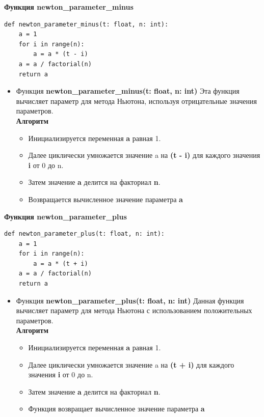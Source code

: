 \documentclass{article}
\begin{document}
\textbf{\large{Функция newton\_parameter\_minus}}

\begin{lstlisting}
def newton_parameter_minus(t: float, n: int):
    a = 1
    for i in range(n):
        a = a * (t - i)
    a = a / factorial(n)
    return a

\end{lstlisting}

\begin{itemize}
\item Функция \textbf{newton\_parameter\_minus(t: float, n: int)} 
Эта функция вычисляет параметр для метода Ньютона, используя отрицательные значения параметров.\\
\textbf{Алгоритм}
\begin{itemize}
    \item Инициализируется переменная \textbf{a} равная 1.
    \item Далее циклически умножается значение a на \textbf{(t - i)} для каждого значения \textbf{i} от 0 до n.
    \item Затем значение \textbf{a} делится на факториал \textbf{n}.
    \item Возвращается вычисленное значение параметра \textbf{a}

\end{itemize}
\end{itemize}


\textbf{\large{Функция newton\_parameter\_plus}}
\begin{lstlisting}
def newton_parameter_plus(t: float, n: int):
    a = 1
    for i in range(n):
        a = a * (t + i)
    a = a / factorial(n)
    return a

\end{lstlisting}

\begin{itemize}
\item Функция \textbf{newton\_parameter\_plus(t: float, n: int)} 
Данная функция вычисляет параметр для метода Ньютона с использованием положительных параметров. \\
\textbf{Алгоритм}
\begin{itemize}
    \item Инициализируется переменная \textbf{a} равная 1.
    \item Далее циклически умножается значение a на \textbf{(t + i)} для каждого значения \textbf{i} от 0 до n.
    \item Затем значение \textbf{a} делится на факториал \textbf{n}.
    \item Функция возвращает вычисленное значение параметра \textbf{a}

\end{itemize}
\end{itemize}
\end{document}
